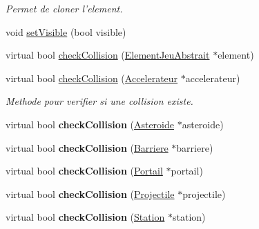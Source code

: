 \begin{DoxyCompactItemize}
\begin{DoxyCompactList}\small\item\em Permet de cloner l'element. \end{DoxyCompactList}\item 
void \hyperlink{class_position_depart_ad201a3eeea197734ca05ed4664b802a1}{set\-Visible} (bool visible)
\item 
virtual bool \hyperlink{class_position_depart_aca5a339f043e3021b77708bbcdcb4515}{check\-Collision} (\hyperlink{class_element_jeu_abstrait}{Element\-Jeu\-Abstrait} $\ast$element)
\item 
\hypertarget{class_position_depart_a8832154671ceadfa95468cb4225378f4}{virtual bool \hyperlink{class_position_depart_a8832154671ceadfa95468cb4225378f4}{check\-Collision} (\hyperlink{class_accelerateur}{Accelerateur} $\ast$accelerateur)}\label{class_position_depart_a8832154671ceadfa95468cb4225378f4}

\begin{DoxyCompactList}\small\item\em Methode pour verifier si une collision existe. \end{DoxyCompactList}\item 
\hypertarget{class_position_depart_a02fbfc88f4df43df0086141aef83e572}{virtual bool {\bfseries check\-Collision} (\hyperlink{class_asteroide}{Asteroide} $\ast$asteroide)}\label{class_position_depart_a02fbfc88f4df43df0086141aef83e572}

\item 
\hypertarget{class_position_depart_a3cbaa4bddba08391232bb7c9cd18475d}{virtual bool {\bfseries check\-Collision} (\hyperlink{class_barriere}{Barriere} $\ast$barriere)}\label{class_position_depart_a3cbaa4bddba08391232bb7c9cd18475d}

\item 
\hypertarget{class_position_depart_adab90619b2e68daf254fd22b194465dd}{virtual bool {\bfseries check\-Collision} (\hyperlink{class_portail}{Portail} $\ast$portail)}\label{class_position_depart_adab90619b2e68daf254fd22b194465dd}

\item 
\hypertarget{class_position_depart_a5564b2f52ac4d8d82e568c37ac9cf7c4}{virtual bool {\bfseries check\-Collision} (\hyperlink{class_projectile}{Projectile} $\ast$projectile)}\label{class_position_depart_a5564b2f52ac4d8d82e568c37ac9cf7c4}

\item 
\hypertarget{class_position_depart_a009f9f677abae1542fcd33fae506fcfe}{virtual bool {\bfseries check\-Collision} (\hyperlink{class_station}{Station} $\ast$station)}\label{class_position_depart_a009f9f677abae1542fcd33fae506fcfe}


\end{DoxyCompactItemize}
